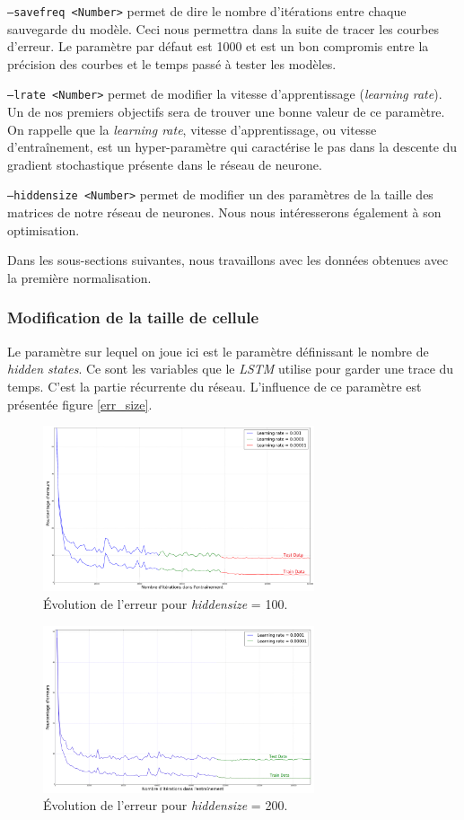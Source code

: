 \documentclass{report}
\begin{document}
\texttt{--savefreq <Number>} permet de dire le nombre d'itérations entre chaque sauvegarde du modèle.
Ceci nous permettra dans la suite de tracer les courbes d'erreur.
Le paramètre par défaut est 1000 et est un bon compromis entre la précision des courbes et le temps passé à tester les modèles.

\texttt{--lrate <Number>} permet de modifier la vitesse d'apprentissage (\textit{learning rate}).
Un de nos premiers objectifs sera de trouver une bonne valeur de ce paramètre.
On rappelle que la \textit{learning rate}, vitesse d'apprentissage, ou vitesse d'entraînement, est un hyper-paramètre qui caractérise le pas dans la descente du gradient stochastique présente dans le réseau de neurone.

\texttt{--hiddensize <Number>} permet de modifier un des paramètres de la taille des matrices de notre réseau de neurones.
Nous nous intéresserons également à son optimisation.

Dans les sous-sections suivantes, nous travaillons avec les données obtenues avec la première normalisation.

\subsubsection{Modification de la taille de cellule}

Le paramètre sur lequel on joue ici est le paramètre définissant le nombre de \textit{hidden states}.
Ce sont les variables que le \textit{LSTM} utilise pour garder une trace du temps.
C'est la partie récurrente du réseau.
L'influence de ce paramètre est présentée figure \ref{err_size}.

\begin{figure}[!h] 
    \center
    \includegraphics[width=8cm]{img/curve_100.png}
    \caption{Évolution de l'erreur pour \textit{hiddensize} = 100.}
    \label{err_size100}
\end{figure}

\begin{figure}[!h] 
	\center
	\includegraphics[width=8cm]{img/curve_200.png}
	\caption{Évolution de l'erreur pour \textit{hiddensize} = 200.}
	\label{err_size200}
\end{figure}
\end{document}
